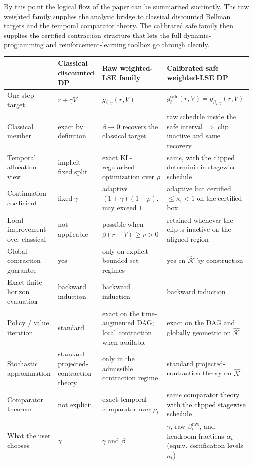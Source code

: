 \documentclass{article}
\theoremstyle{remark}
\newcommand{\safe}{\mathrm{safe}}
\newcommand{\Ksafe}{\widehat{\mathcal K}}
\begin{document}
By this point the logical flow of the paper can be summarized succinctly.
The raw weighted family supplies the analytic bridge to classical discounted Bellman targets and the temporal comparator theory.
The calibrated safe family then supplies the certified contraction structure that lets the full dynamic-programming and reinforcement-learning toolbox go through cleanly.
\begin{center}
\captionsetup{type=table}
\label{tab:master-comparison}
\small
\begin{tabularx}{\textwidth}{@{}>{\raggedright\arraybackslash}p{}XXX@{}}
\toprule
 & Classical discounted DP & Raw weighted-LSE family & Calibrated safe weighted-LSE DP \\
\midrule
One-step target & $r+\gamma V$ & $g_{\beta,\gamma}(r,V)$ & $g_t^{\safe}(r,V)=g_{\widetilde\beta_t,\gamma}(r,V)$ \\
Classical member & exact by definition & $\beta\to 0$ recovers the classical target & raw schedule inside the safe interval $\Rightarrow$ clip inactive and same recovery \\
Temporal allocation view & implicit fixed split & exact KL-regularized optimization over $\rho$ & same, with the clipped deterministic stagewise schedule \\
Continuation coefficient & fixed $\gamma$ & adaptive $(1+\gamma)(1-\rho)$, may exceed $1$ & adaptive but certified $\le \kappa_t<1$ on the certified box \\
Local improvement over classical & not applicable & possible when $\beta(r-V)\ge \eta>0$ & retained whenever the clip is inactive on the aligned region \\
Global contraction guarantee & yes & only on explicit bounded-set regimes & yes on $\Ksafe$ by construction \\
Exact finite-horizon evaluation & backward induction & backward induction & backward induction \\
Policy / value iteration & standard & exact on the time-augmented DAG; local contraction when available & exact on the DAG and globally geometric on $\Ksafe$ \\
Stochastic approximation & standard projected-contraction theory & only in the admissible contraction regime & standard projected-contraction theory on $\Ksafe$ \\
Comparator theorem & not explicit & exact temporal comparator over $\rho_t$ & same comparator theory with the clipped stagewise schedule \\
What the user chooses & $\gamma$ & $\gamma$ and $\beta$ & $\gamma$, raw $\beta_t^{\mathrm{raw}}$, and headroom fractions $\alpha_t$ (equiv. certification levels $\kappa_t$) \\
\bottomrule
\end{tabularx}
\end{center}
\end{document}
